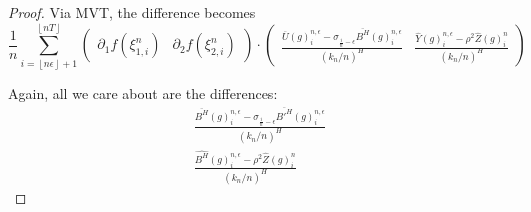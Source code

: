 \documentclass[12pt,letterpaper]{article}
\theoremstyle{definition}
\begin{document}
\begin{proof}
  Via MVT, the difference becomes
  \begin{equation}
    \frac{1}{n}\sum_{i=\left\lfloor n\epsilon \right\rfloor + 1}^{\left\lfloor nT \right\rfloor} \begin{pmatrix} \partial_1 f(\xi_{1,i}^n) & \partial_2 f(\xi_{2,i}^n) \end{pmatrix} \cdot \begin{pmatrix} \frac{\overline{U}(g)^{n,\epsilon}_i - \sigma_{\frac{i}{n}-\epsilon}\overline{B^H}(g)^{n,\epsilon}_i}{(k_n/n)^H} & \frac{\widehat{Y}(g)^{n,\epsilon}_i - \rho^2\widehat{Z}(g)^{n}_i}{(k_n/n)^H} \end{pmatrix}
  \end{equation}

  Again, all we care about are the differences:
  \begin{gather}
    \label{eqn:discdiff1}
    \frac{\overline{B^{H}}(g)^{n,\epsilon}_i - \sigma_{\frac{i}{n}-\epsilon}\overline{B'^H}(g)^{n,\epsilon}_i}{(k_n/n)^H} \\
    \label{eqn:discdiff2}
    \frac{\widehat{B^{H}}(g)^{n,\epsilon}_i - \rho^2\widehat{Z}(g)^{n}_i}{(k_n/n)^H}
  \end{gather}


\end{proof}
\end{document}
